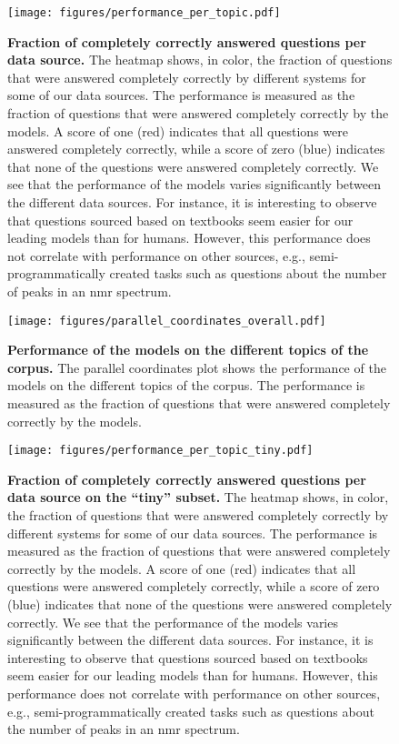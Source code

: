 \begin{figure}[htb]
    \centering
    \texttt{[image: figures/performance\_per\_topic.pdf]}
    \caption{\textbf{Fraction of completely correctly answered questions per data source.} The heatmap shows, in color, the fraction of questions that were answered completely correctly by different systems for some of our data sources. The performance is measured as the fraction of questions that were answered completely correctly by the models. A score of one (red) indicates that all questions were answered completely correctly, while a score of zero (blue) indicates that none of the questions were answered completely correctly.
        We see that the performance of the models varies significantly between the different data sources. For instance, it is interesting to observe that questions sourced based on textbooks seem easier for our leading models than for humans. However, this performance does not correlate with performance on other sources, e.g., semi-programmatically created tasks such as questions about the number of peaks in an \gls{nmr} spectrum.
    }
    \label{fig:performance_per_topic}
\end{figure}


\begin{figure}[htb]
    \centering
    \texttt{[image: figures/parallel\_coordinates\_overall.pdf]}
    \caption{\textbf{Performance of the models on the different topics of the \chembench corpus.} The parallel coordinates plot shows the performance of the models on the different topics of the \chembench corpus. The performance is measured as the fraction of questions that were answered completely correctly by the models. }
    \label{fig:parallel_coordinates_overall}
\end{figure}


\begin{figure}[htb]
    \centering
    \texttt{[image: figures/performance\_per\_topic\_tiny.pdf]}
    \caption{\textbf{Fraction of completely correctly answered questions per data source on the \enquote{tiny} subset.} The heatmap shows, in color, the fraction of questions that were answered completely correctly by different systems for some of our data sources. The performance is measured as the fraction of questions that were answered completely correctly by the models. A score of one (red) indicates that all questions were answered completely correctly, while a score of zero (blue) indicates that none of the questions were answered completely correctly.
        We see that the performance of the models varies significantly between the different data sources. For instance, it is interesting to observe that questions sourced based on textbooks seem easier for our leading models than for humans. However, this performance does not correlate with performance on other sources, e.g., semi-programmatically created tasks such as questions about the number of peaks in an \gls{nmr} spectrum.
    }
    \label{fig:performance_per_topic_tiny}
\end{figure}



